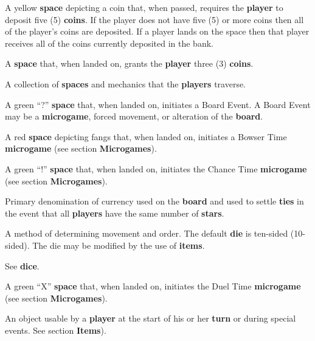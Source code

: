 \documentclass{article}
\begin{document}
\begin{description}[style=nextline]
\item[Bank Space] A yellow \textbf{space} depicting a coin that,
when passed, requires the \textbf{player} to deposit five (5) \textbf{coins}.
If the player does not have five (5) or more coins then all of the player's
coins are deposited.  If a player lands on the space then that player
receives all of the coins currently deposited in the bank.

\item[Blue Space] A \textbf{space} that, when landed on, grants the
\textbf{player} three (3) \textbf{coins}.

\item[Board] A collection of \textbf{spaces} and mechanics that the
\textbf{players} traverse.

\item[Board Event] A green ``?'' \textbf{space} that, when landed on,
initiates a Board Event.  A Board Event may be a \textbf{microgame},
forced movement, or alteration of the \textbf{board}.

\item[Bowser Space] A red \textbf{space} depicting fangs that,
when landed on, initiates a Bowser Time \textbf{microgame} (see
section \textbf{Microgames}).

\item[Chance Time] A green ``!'' \textbf{space} that, when landed on,
initiates the Chance Time \textbf{microgame} (see section
\textbf{Microgames}).

\item[Coin] Primary denomination of currency used on the \textbf{board}
and used to settle \textbf{ties} in the event that all \textbf{players}
have the same number of \textbf{stars}.

\item[Dice] A method of determining movement and order. The default
\textbf{die} is ten-sided (10-sided).  The die may be modified by the
use of \textbf{items}.

\item[Die] See \textbf{dice}.

\item[Duel Time] A green ``X'' \textbf{space} that, when landed on,
initiates the Duel Time \textbf{microgame} (see section \textbf{Microgames}).

\item[Item] An object usable by a \textbf{player} at the start of
his or her \textbf{turn} or during special events. See section \textbf{Items}).


\end{description}
\end{document}
